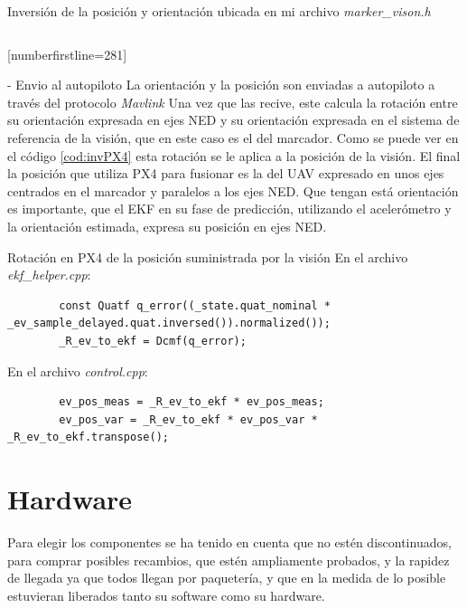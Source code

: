 	\figEjes

	\begin{codigo}{Inversión de la posición y orientación ubicada en mi archivo \textit{marker\_vison.h}}
	\label{cod:inver}
	\inputminted{c++}{posicionamiento_marcadores/cod_inver.cpp}[numberfirstline=281]
	\end{codigo} 

	
- Envio al autopiloto 
	La orientación y la posición son enviadas a autopiloto a través del protocolo \textit{Mavlink}
	Una vez que las recive, este calcula la rotación entre su orientación expresada en ejes NED y su orientación expresada en el sistema de referencia de la visión, que en este caso es el del marcador. Como se puede ver en el código \ref{cod:invPX4} esta rotación se le aplica a la posición de la visión. El final la posición que utiliza PX4 para fusionar es la del UAV expresado en unos ejes centrados en el marcador y paralelos a los ejes NED. Que tengan está orientación es importante, que el EKF en su fase de predicción, utilizando el acelerómetro y la orientación estimada, expresa su posición en ejes NED.
	\begin{codigo}{Rotación en PX4 de la posición suministrada por la visión}
	\label{cod:invPX4}
	En el archivo \textit{ekf\_helper.cpp}:
	\begin{verbatim}
		const Quatf q_error((_state.quat_nominal * _ev_sample_delayed.quat.inversed()).normalized());
		_R_ev_to_ekf = Dcmf(q_error);
	\end{verbatim}
	En el archivo \textit{control.cpp}:
	\begin{verbatim}
		ev_pos_meas = _R_ev_to_ekf * ev_pos_meas;
		ev_pos_var = _R_ev_to_ekf * ev_pos_var * _R_ev_to_ekf.transpose();
	\end{verbatim}
	\end{codigo} 



\section{Hardware}
Para elegir los componentes se ha tenido en cuenta que no estén discontinuados, para comprar posibles recambios, que estén ampliamente probados, y la rapidez de llegada ya que todos llegan por paquetería, y que en la medida de lo posible estuvieran liberados tanto su software como su hardware. 

